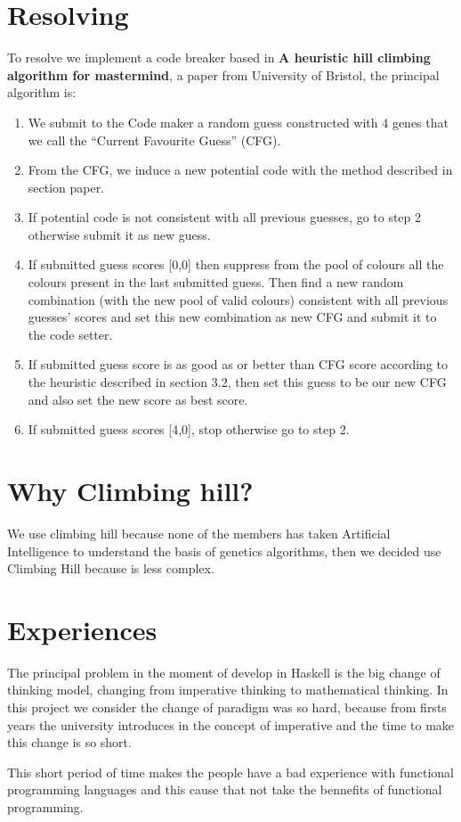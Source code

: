 \section{Resolving}
To resolve we implement a code breaker based in \textbf{
A heuristic hill climbing algorithm for mastermind}, a paper from University of Bristol, the principal algorithm is: 
 \begin{enumerate}
 	\item We submit to the Code maker a random guess
 	constructed with 4 genes that we call the “Current
 	Favourite Guess” (CFG).
 	\item From the CFG, we induce a new potential code
 	with the method described in section paper.
 	\item If potential code is not consistent with all previous
 	guesses, go to step 2 otherwise submit it as new
 	guess.
 	\item If submitted guess scores [0,0] then suppress from
 	the pool of colours all the colours present in the last
 	submitted guess. Then find a new random
 	combination (with the new pool of valid colours)
 	consistent with all previous guesses’ scores and set
 	this new combination as new CFG and submit it to
 	the code setter.
 	\item If submitted guess score is as good as or better
 	than CFG score according to the heuristic described
 	in section 3.2, then set this guess to be our new CFG
 	and also set the new score as best score.
 	\item If submitted guess scores [4,0], stop otherwise go
 	to step 2.
 \end{enumerate}

\section{Why Climbing hill?}
We use climbing hill because none of the members has taken Artificial Intelligence to understand the basis of genetics algorithms, then we decided use Climbing Hill because is less complex.

\section{Experiences}
The principal problem in the moment of develop in Haskell is the big change of thinking model, changing from imperative thinking to mathematical thinking. In this project we consider the change of paradigm was so hard, because from firsts years the university introduces in the concept of imperative and the time to make this change is so short. 

This short period of time makes the people have a bad experience with functional programming languages and this cause that not take the bennefits of functional programming.
